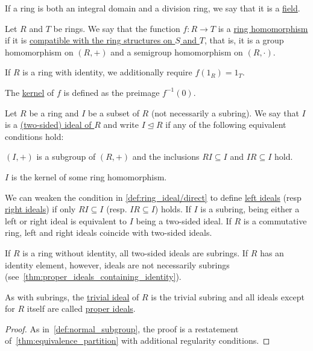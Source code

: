 \begin{definition}\label{def:field}
  If a ring is both an integral domain and a division ring, we say that it is a \uline{field}.
\end{definition}

\begin{definition}\label{def:ring_homomorphism}
  Let $R$ and $T$ be rings. We say that the function $f: R \to T$ is a \uline{ring homomorphism} if it is \uline{compatible with the ring structures on $S$ and $T$}, that is, it is a group homomorphism on $(R, +)$ and a semigroup homomorphism on $(R, \cdot)$.

  If $R$ is a ring with identity, we additionally require $f(1_R) = 1_T$.

  The \uline{kernel} of $f$ is defined as the preimage $f^{-1}(0)$.
\end{definition}

\begin{definition}\label{def:ring_ideal}
  Let $R$ be a ring and $I$ be a subset of $R$ (not necessarily a subring). We say that $I$ is a \uline{(two-sided) ideal of $R$} and write $I \unlhd R$ if any of the following equivalent conditions hold:
  \begin{defenum}
    \item\label{def:ring_ideal/direct} $(I, +)$ is a subgroup of $(R, +)$ and the inclusions $RI \subseteq I$ and $IR \subseteq I$ hold.
    \item\label{def:ring_ideal/kernel} $I$ is the kernel of some ring homomorphism.
  \end{defenum}

  We can weaken the condition in \ref{def:ring_ideal/direct} to define \uline{left ideals} (resp \uline{right ideals}) if only $RI \subseteq I$ (resp. $IR \subseteq I$) holds. If $I$ is a subring, being either a left or right ideal is equivalent to $I$ being a two-sided ideal. If $R$ is a commutative ring, left and right ideals coincide with two-sided ideals.

  If $R$ is a ring without identity, all two-sided ideals are subrings. If $R$ has an identity element, however, ideals are not necessarily subrings (see~\cref{thm:proper_ideals_containing_identity}).

  As with subrings, the \uline{trivial ideal} of $R$ is the trivial subring and all ideals except for $R$ itself are called \uline{proper ideals}.
\end{definition}
\begin{proof}
  As in~\cref{def:normal_subgroup}, the proof is a restatement of~\cref{thm:equivalence_partition} with additional regularity conditions.
\end{proof}

